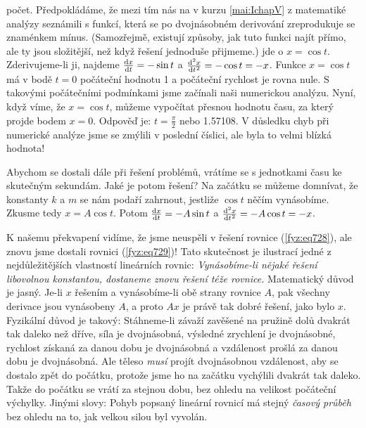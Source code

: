     počet. Předpokládáme, že mezi tím nás na v kurzu \ref{mai:IchapV} z matematiké analýzy seznámili
    s funkcí, která se po dvojnásobném derivování zreprodukuje se znaménkem mínus. (Samozřejmě,
    existují způsoby, jak tuto funkci najít přímo, ale ty jsou složitější, než když řešení jednoduše
    přijmeme.) jde o \(x=\cos t\). Zderivujeme-li ji, najdeme \(\diff{x}{t} = -\sin t\) a
    \(\diff[2]xt=-\cos t=-x\). Funkce \(x=\cos t\) má v bodě \(t= 0\) počáteční hodnotu \num{1} a
    počáteční rychlost je rovna nule. S takovými počátečními podmínkami jsme začínali naši
    numerickou analýzu. Nyní, když víme, že \(x=\cos t\), můžeme vypočítat přesnou hodnotu času, za
    který projde bodem \(x=0\). Odpověď je: \(t=\frac{\pi}{2}\) nebo \num{1.57108}. V důsledku chyb
    při numerické analýze jsme se zmýlili v poslední číslici, ale byla to velmi blízká hodnota!

    Abychom se dostali dále při řešení problémů, vrátíme se s jednotkami času ke skutečným sekundám.
    Jaké je potom řešení? Na začátku se můžeme domnívat, že konstanty \(k\) a \(m\) se nám podaří
    zahrnout, jestliže \(\cos t\) něčím vynásobíme. Zkusme tedy \(x=A\cos t\). Potom \(\diff{x}{t}=
    -A\sin t\) a \(\diff[2]xt = -A\cos t= - x\).

    K našemu překvapení vidíme, že jsme neuspěli v řešení rovnice (\ref{fyz:eq728}), ale znovu jsme
    dostali rovnici (\ref{fyz:eq729})! Tato skutečnost je ilustrací jedné z nejdůležitějších
    vlastností lineárních rovnic: \emph{Vynásobíme-li nějaké řešení libovolnou konstantou, dostaneme
    znovu řešení téže rovnice.} Matematický důvod je jasný. Je-li \(x\) řešením a vynásobíme-li obě
    strany rovnice \(A\), pak všechny derivace jsou vynásobeny \(A\), a proto \(Ax\) je právě tak
    dobré řešení, jako bylo \(x\). Fyzikální důvod je takový: Stáhneme-li závaží zavěšené na pružině
    dolů dvakrát tak daleko než dříve, síla je dvojnásobná, výsledné zrychlení je dvojnásobné,
    rychlost získaná za danou dobu je dvojnásobná a vzdálenost prošlá za danou dobu je dvojnásobná.
    Ale těleso \emph{musí} projít dvojnásobnou vzdálenost, aby se dostalo zpět do počátku, protože
    jsme ho na začátku vychýlili dvakrát tak daleko. Takže do počátku se vrátí za stejnou dobu, bez
    ohledu na velikost počáteční výchylky. Jinými slovy: Pohyb popsaný lineární rovnicí má stejný
    \emph{časový průběh} bez ohledu na to, jak velkou silou byl vyvolán.

